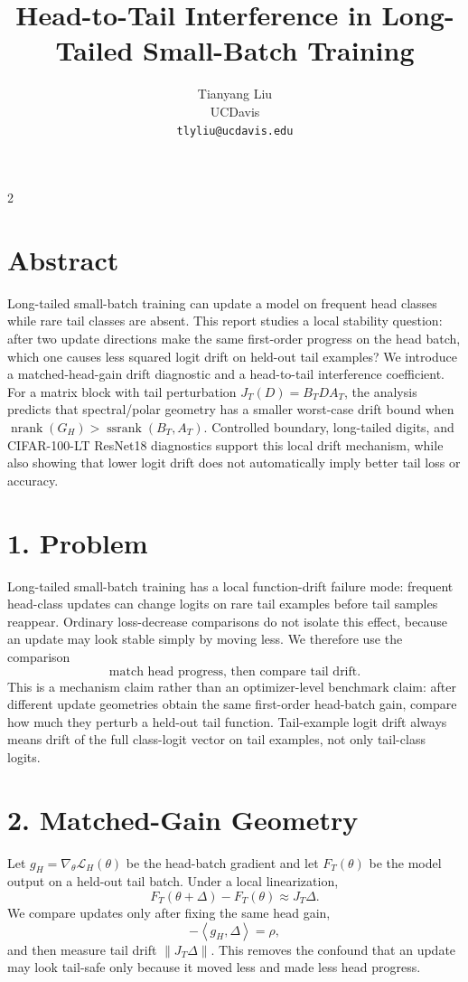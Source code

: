 \documentclass[10pt]{article}
\title{\vspace{-1.2em}Head-to-Tail Interference in Long-Tailed Small-Batch Training}
\author{\small Tianyang Liu\\[-0.15em]\small UCDavis\\[-0.15em]\small \texttt{tlyliu@ucdavis.edu}}
\date{\vspace{-1.4em}}
\newcommand{\Loss}{\mathcal L}
\newcommand{\norm}[1]{\left\lVert #1 \right\rVert}
\newcommand{\inner}[2]{\left\langle #1,#2 \right\rangle}
\newcommand{\nrank}{\operatorname{nrank}}
\newcommand{\ssrank}{\operatorname{ssrank}}
\begin{document}
\maketitle
\vspace{-1.1em}
\begin{multicols}{2}

\section*{Abstract}
Long-tailed small-batch training can update a model on frequent head classes while rare tail classes are absent. This report studies a local stability question: after two update directions make the same first-order progress on the head batch, which one causes less squared logit drift on held-out tail examples? We introduce a matched-head-gain drift diagnostic and a head-to-tail interference coefficient. For a matrix block with tail perturbation \(J_T(D)=B_TDA_T\), the analysis predicts that spectral/polar geometry has a smaller worst-case drift bound when \(\nrank(G_H)>\ssrank(B_T,A_T)\). Controlled boundary, long-tailed digits, and CIFAR-100-LT ResNet18 diagnostics support this local drift mechanism, while also showing that lower logit drift does not automatically imply better tail loss or accuracy.

\section*{1. Problem}
Long-tailed small-batch training has a local function-drift failure mode: frequent head-class updates can change logits on rare tail examples before tail samples reappear. Ordinary loss-decrease comparisons do not isolate this effect, because an update may look stable simply by moving less. We therefore use the comparison
\[
\boxed{\text{match head progress, then compare tail drift}.}
\]
This is a mechanism claim rather than an optimizer-level benchmark claim: after different update geometries obtain the same first-order head-batch gain, compare how much they perturb a held-out tail function. Tail-example logit drift always means drift of the full class-logit vector on tail examples, not only tail-class logits.

\section*{2. Matched-Gain Geometry}
Let \(g_H=\nabla_\theta\Loss_H(\theta)\) be the head-batch gradient and let \(F_T(\theta)\) be the model output on a held-out tail batch. Under a local linearization,
\[
F_T(\theta+\Delta)-F_T(\theta)\approx J_T\Delta .
\]
We compare updates only after fixing the same head gain,
\[
-\inner{g_H}{\Delta}=\rho,
\]
and then measure tail drift \(\norm{J_T\Delta}\). This removes the confound that an update may look tail-safe only because it moved less and made less head progress.


\end{multicols}
\end{document}
